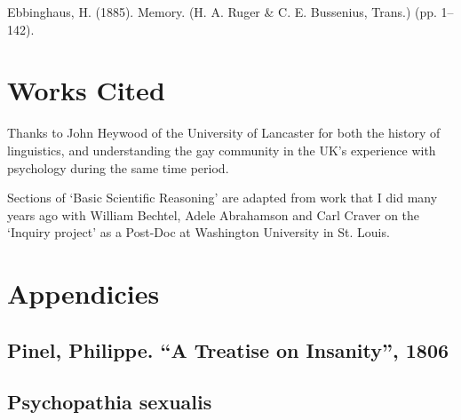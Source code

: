 \begin{refsection}
Ebbinghaus, H. (1885). Memory. (H. A. Ruger \& C. E. Bussenius, Trans.) (pp. 1–142).

\pagebreak 

\chapter{Works Cited}
\label{workscited}


\backmatter
\printindex
\printbibliography[heading=subbibliography]



\pagebreak 

Thanks to John Heywood of the University of Lancaster for both the history of linguistics, and understanding the gay community in the UK's experience with psychology during the same time period.

Sections of `Basic Scientific Reasoning' are adapted from work that I did many years ago with William Bechtel, Adele Abrahamson and Carl Craver on the `Inquiry project' as a Post-Doc at Washington University in St. Louis.

\pagebreak 

 \renewcommand*{\thechapter}{}
\renewcommand*{\thesection}{\Alph{section}}
\setcounter{chapter}{0}
\renewcommand*{\thesubsection}{\arabic{subsection}}



\chapter{Appendicies}
\label{appendicies}

\begin{appendices}
\let\svaddcontentsline\addcontentsline
\renewcommand\addcontentsline[3]{%
  \ifthenelse{\equal{#1}{lof}}{}%
  {\ifthenelse{\equal{#1}{lot}}{}{\svaddcontentsline{#1}{#2}{#3}}}}





\section{Pinel, Philippe. ``A Treatise on Insanity'', 1806}
\label{pinelphilippe.atreatiseoninsanity1806}

\label{app: Pinel}


\section{Psychopathia sexualis}
\label{psychopathiasexualis}


\end{appendices}
\end{refsection}
